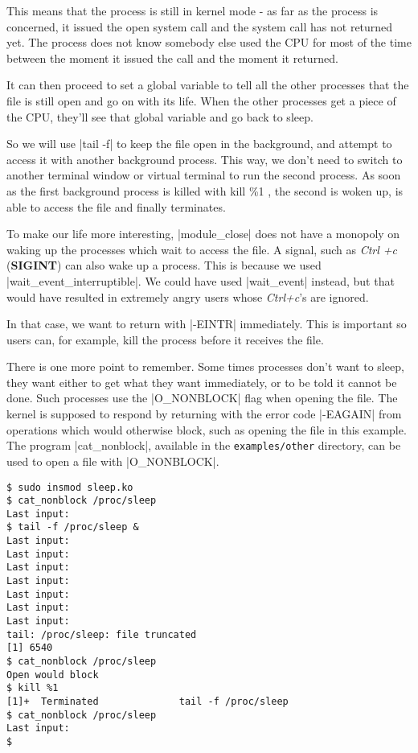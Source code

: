 \documentclass[10pt, oneside]{book}
\begin{document}
This means that the process is still in kernel mode - as far as the process is concerned, it issued the open system call and the system call has not returned yet.
The process does not know somebody else used the CPU for most of the time between the moment it issued the call and the moment it returned.

It can then proceed to set a global variable to tell all the other processes that the file is still open and go on with its life.
When the other processes get a piece of the CPU, they'll see that global variable and go back to sleep.

So we will use \sh|tail -f| to keep the file open in the background, and attempt to access it with another background process.
This way, we don't need to switch to another terminal window or virtual terminal to run the second process.
As soon as the first background process is killed with kill \%1 , the second is woken up, is able to access the file and finally terminates.

To make our life more interesting, \cpp|module_close| does not have a monopoly on waking up the processes which wait to access the file.
A signal, such as \emph{Ctrl +c} (\textbf{SIGINT}) can also wake up a process. This is because we used \cpp|wait_event_interruptible|.
We could have used \cpp|wait_event| instead, but that would have resulted in extremely angry users whose \emph{Ctrl+c}'s are ignored.

In that case, we want to return with \cpp|-EINTR| immediately. This is important so users can, for example, kill the process before it receives the file.

There is one more point to remember. Some times processes don't want to sleep, they want either to get what they want immediately, or to be told it cannot be done.
Such processes use the \cpp|O_NONBLOCK| flag when opening the file.
The kernel is supposed to respond by returning with the error code \cpp|-EAGAIN| from operations which would otherwise block, such as opening the file in this example. The program \sh|cat_nonblock|, available in the \verb|examples/other| directory, can be used to open a file with \cpp|O_NONBLOCK|.

\begin{verbatim}
$ sudo insmod sleep.ko
$ cat_nonblock /proc/sleep
Last input:
$ tail -f /proc/sleep &
Last input:
Last input:
Last input:
Last input:
Last input:
Last input:
Last input:
tail: /proc/sleep: file truncated
[1] 6540
$ cat_nonblock /proc/sleep
Open would block
$ kill %1
[1]+  Terminated              tail -f /proc/sleep
$ cat_nonblock /proc/sleep
Last input:
$
\end{verbatim}
\end{document}
